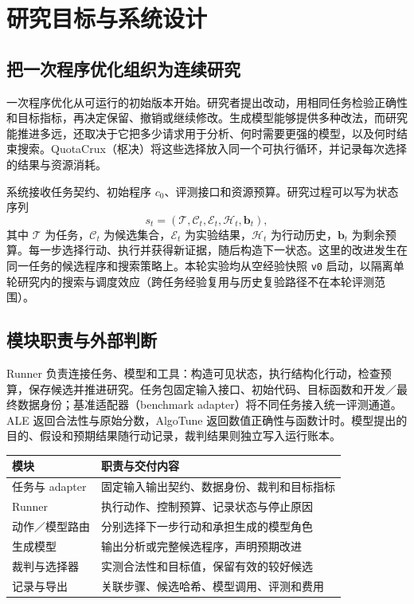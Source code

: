 \section{研究目标与系统设计}
\label{sec:system}
\subsection{把一次程序优化组织为连续研究}
一次程序优化从可运行的初始版本开始。研究者提出改动，用相同任务检验正确性和目标指标，再决定保留、撤销或继续修改。生成模型能够提供多种改法，而研究能推进多远，还取决于它把多少请求用于分析、何时需要更强的模型，以及何时结束搜索。QuotaCrux（枢决）将这些选择放入同一个可执行循环，并记录每次选择的结果与资源消耗。

系统接收任务契约、初始程序 $c_0$、评测接口和资源预算。研究过程可以写为状态序列
\begin{equation}
 s_t=(\mathcal{T},\mathcal{C}_t,\mathcal{E}_t,\mathcal{H}_t,\mathbf{b}_t),
\end{equation}
其中 $\mathcal{T}$ 为任务，$\mathcal{C}_t$ 为候选集合，$\mathcal{E}_t$ 为实验结果，$\mathcal{H}_t$ 为行动历史，$\mathbf{b}_t$ 为剩余预算。每一步选择行动、执行并获得新证据，随后构造下一状态。这里的改进发生在同一任务的候选程序和搜索策略上。本轮实验均从空经验快照 \texttt{v0} 启动，以隔离单轮研究内的搜索与调度效应（跨任务经验复用与历史复验路径不在本轮评测范围）。

\subsection{模块职责与外部判断}
Runner 负责连接任务、模型和工具：构造可见状态，执行结构化行动，检查预算，保存候选并推进研究。任务包固定输入接口、初始代码、目标函数和开发／最终数据身份；基准适配器（benchmark adapter）将不同任务接入统一评测通道。ALE 返回合法性与原始分数，AlgoTune 返回数值正确性与函数计时。模型提出的目的、假设和预期结果随行动记录，裁判结果则独立写入运行账本。

\par\noindent
\begin{tabularx}{\linewidth}{@{}lX@{}}\toprule
模块 & 职责与交付内容\\\midrule
任务与 adapter & 固定输入输出契约、数据身份、裁判和目标指标\\
Runner & 执行动作、控制预算、记录状态与停止原因\\
动作／模型路由 & 分别选择下一步行动和承担生成的模型角色\\
生成模型 & 输出分析或完整候选程序，声明预期改进\\
裁判与选择器 & 实测合法性和目标值，保留有效的较好候选\\
记录与导出 & 关联步骤、候选哈希、模型调用、评测和费用\\\bottomrule
\end{tabularx}\par

